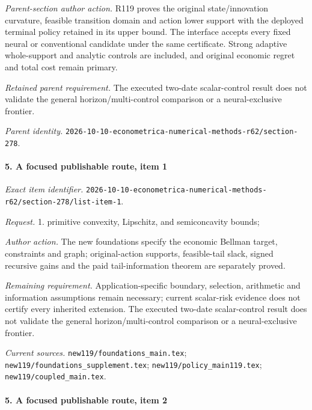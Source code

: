 \emph{Parent-section author action.} R119 proves the original state/\allowbreak{}innovation curvature, feasible transition domain and action lower support with the deployed terminal policy retained in its upper bound. The interface accepts every fixed neural or conventional candidate under the same certificate. Strong adaptive whole-support and analytic controls are included, and original economic regret and total cost remain primary.

\par\emph{Retained parent requirement.} The executed two-date scalar-control result does not validate the general horizon/\allowbreak{}multi-control comparison or a neural-exclusive frontier.

\par\emph{Parent identity.} \nolinkurl{2026-10-10-econometrica-numerical-methods-r62/section-278}.

\paragraph{5. A focused publishable route, item 1}

\emph{Exact item identifier.} \nolinkurl{2026-10-10-econometrica-numerical-methods-r62/section-278/list-item-1}.

\par\emph{Request.} 1. primitive convexity, Lipschitz, and semiconcavity bounds;

\par\emph{Author action.} The new foundations specify the economic Bellman target, constraints and graph; original-action supports, feasible-tail slack, signed recursive gains and the paid tail-information theorem are separately proved.

\par\emph{Remaining requirement.} Application-specific boundary, selection, arithmetic and information assumptions remain necessary; current scalar-risk evidence does not certify every inherited extension. The executed two-date scalar-control result does not validate the general horizon/\allowbreak{}multi-control comparison or a neural-exclusive frontier.

\par\emph{Current sources.} \nolinkurl{new119/foundations_main.tex}; \nolinkurl{new119/foundations_supplement.tex}; \nolinkurl{new119/policy_main119.tex}; \nolinkurl{new119/coupled_main.tex}.

\paragraph{5. A focused publishable route, item 2}

